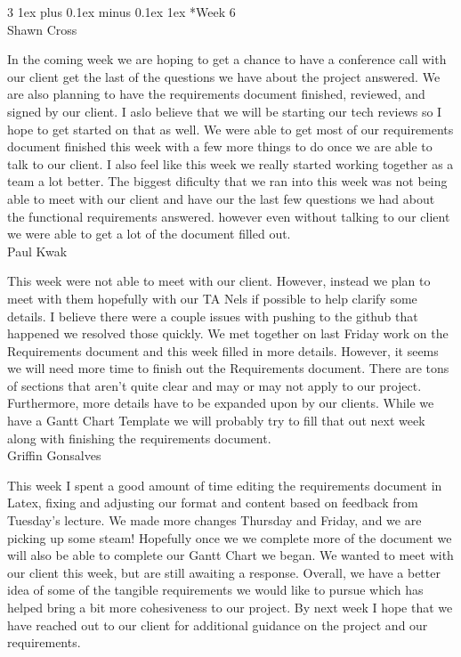 \documentclass[letterpaper, 10pt, draftclsnofoot, compsoc, onecolumn]{IEEEtran}
\makeatletter
\def\subsubsection{\@startsection{subsubsection}%
                                 {3}%
                                 {\z@}%
                                 {1ex plus 0.1ex minus 0.1ex}%
                                 {1ex}%
                                 {\normalfont\normalsize}}%
\makeatother
\begin{document}
\subsubsection*{Week 6}\hspace*{\fill} \\
Shawn Cross

In the coming week we are hoping to get a chance to have a conference call with our client get the last of the questions we have about the project answered. We are also planning to have the requirements document finished, reviewed, and signed by our client. I aslo believe that we will be starting our tech reviews so I hope to get started on that as well. We were able to get most of our requirements document finished this week with a few more things to do once we are able to talk to our client. I also feel like this week we really started working together as a team a lot better. The biggest dificulty that we ran into this week was not being able to meet with our client and have our the last few questions we had about the functional requirements answered. however even without talking to our client we were able to get a lot of the document filled out.\\

Paul Kwak

This week were not able to meet with our client. However, instead we plan to meet with them hopefully with our TA Nels if possible to help clarify some details. I believe there were a couple issues with pushing to the github that happened we resolved those quickly. We met together on last Friday work on the Requirements document and this week filled in more details. However, it seems we will need more time to finish out the Requirements document. There are tons of sections that aren't quite clear and may or may not apply to our project. Furthermore, more details have to be expanded upon by our clients. While we have a Gantt Chart Template we will probably try to fill that out next week along with finishing the requirements document.\\

Griffin Gonsalves

This week I spent a good amount of time editing the requirements document in Latex, fixing and adjusting our format and content based on feedback from Tuesday's lecture. We made more changes Thursday and Friday, and we are picking up some steam! Hopefully once we we complete more of the document we will also be able to complete our Gantt Chart we began. We wanted to meet with our client this week, but are still awaiting a response. Overall, we have a better idea of some of the tangible requirements we would like to pursue which has helped bring a bit more cohesiveness to our project. By next week I hope that we have reached out to our client for additional guidance on the project and our requirements.\\
\end{document}
